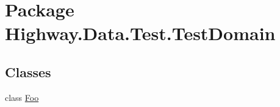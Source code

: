\hypertarget{namespace_highway_1_1_data_1_1_test_1_1_test_domain}{\section{Package Highway.\-Data.\-Test.\-Test\-Domain}
\label{namespace_highway_1_1_data_1_1_test_1_1_test_domain}
}
\subsection*{Classes}
\begin{DoxyCompactItemize}
\item 
class \hyperlink{class_highway_1_1_data_1_1_test_1_1_test_domain_1_1_foo}{Foo}
\end{DoxyCompactItemize}
